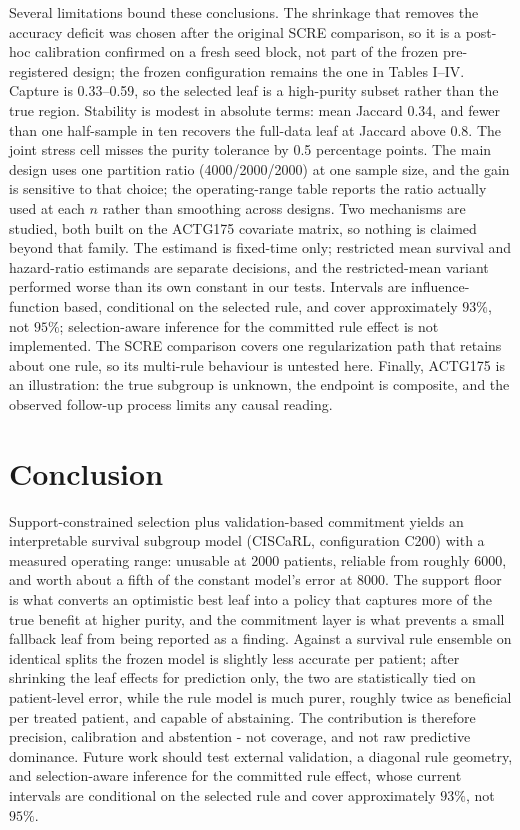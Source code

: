 \documentclass[conference]{IEEEtran}
\begin{document}
Several limitations bound these conclusions. The shrinkage that removes the
accuracy deficit was chosen after the original SCRE comparison, so it is a
post-hoc calibration confirmed on a fresh seed block, not part of the frozen
pre-registered design; the frozen configuration remains the one in Tables
I--IV. Capture is 0.33--0.59, so the
selected leaf is a high-purity subset rather than the true region. Stability is
modest in absolute terms: mean Jaccard 0.34, and fewer than one half-sample in
ten recovers the full-data leaf at Jaccard above 0.8. The joint stress cell
misses the purity tolerance by 0.5 percentage points. The main design uses one
partition ratio (4000/2000/2000) at one sample size, and the gain is sensitive
to that choice; the operating-range table reports the ratio actually used at
each $n$ rather than smoothing across designs. Two mechanisms are studied, both
built on the ACTG175 covariate matrix, so nothing is claimed beyond that
family. The estimand is fixed-time only; restricted mean survival and
hazard-ratio estimands are separate decisions, and the restricted-mean variant
performed worse than its own constant in our tests. Intervals are
influence-function based, conditional on the selected rule, and cover
approximately $93\%$, not $95\%$; selection-aware inference for the committed
rule effect is not implemented. The SCRE comparison covers one regularization
path that retains about one rule, so its multi-rule behaviour is untested here.
Finally, ACTG175 is an illustration: the true subgroup is unknown, the endpoint
is composite, and the observed follow-up process limits any causal reading.

\section{Conclusion}

Support-constrained selection plus validation-based commitment yields an
interpretable survival subgroup model (CISCaRL, configuration C200) with a
measured operating range: unusable
at 2000 patients, reliable from roughly 6000, and worth about a fifth of the
constant model's error at 8000. The support floor is what converts an
optimistic best leaf into a policy that captures more of the true benefit at
higher purity, and the commitment layer is what prevents a small fallback leaf
from being reported as a finding. Against a survival rule ensemble on identical
splits the frozen model is slightly less accurate per patient; after shrinking
the leaf effects for prediction only, the two are statistically tied on
patient-level error, while the rule model is much purer, roughly twice as
beneficial per treated patient, and capable of abstaining. The contribution is
therefore precision, calibration and abstention - not coverage, and not raw
predictive dominance.
Future work should test external validation, a diagonal rule geometry, and
selection-aware inference for the committed rule effect, whose current
intervals are conditional on the selected rule and cover approximately $93\%$,
not $95\%$.
\end{document}
